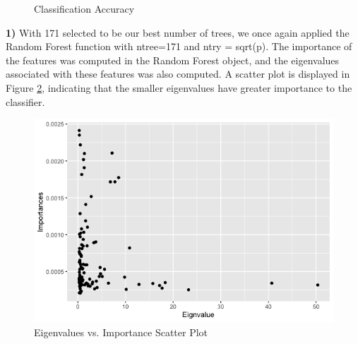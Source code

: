 \documentclass{homework}
\begin{document}
\begin{figure}[H]
    \centering
    \caption{Classification Accuracy}
    \label{classacc}
\end{figure}

\question %
\textbf{1)} With 171 selected to be our best number of trees, we once again applied the Random Forest function with ntree=171 and ntry = sqrt(p). The importance of the features was computed in the Random Forest object, and the eigenvalues associated with these features was also computed. A scatter plot is displayed in Figure \ref{scatter}, indicating that the smaller eigenvalues have greater importance to the classifier.

\begin{figure}[H]
    \centering
    \includegraphics[width=13cm]{images/IMP.png}
    \caption{Eigenvalues vs. Importance Scatter Plot}
    \label{scatter}
\end{figure}
\end{document}
